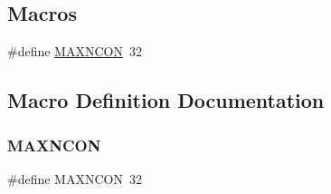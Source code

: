 \subsection*{Macros}
\begin{DoxyCompactItemize}
\item 
\#define \hyperlink{a00431_a19077dd7bbfeda8e56fd21eaeb263396}{M\+A\+X\+N\+C\+ON}~32
\end{DoxyCompactItemize}


\subsection{Macro Definition Documentation}
\mbox{\label{a00431_a19077dd7bbfeda8e56fd21eaeb263396}} 
\subsubsection{\texorpdfstring{M\+A\+X\+N\+C\+ON}{MAXNCON}}
{\footnotesize\ttfamily \#define M\+A\+X\+N\+C\+ON~32}


